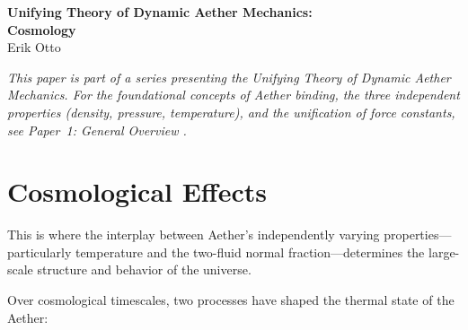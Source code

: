 ﻿\documentclass[12pt,letterpaper]{article}
\begin{document}
\begin{center}
{\LARGE\bfseries Unifying Theory of Dynamic Aether Mechanics:\\
Cosmology}\\[1em]
{\large Erik Otto}
\end{center}

\vspace{1em}

\begin{abstract}
Within the Dynamic Aether Mechanics framework, cosmological phenomena emerge
from the three independently varying properties of the Aether medium (density,
pressure, temperature).  This paper explains cosmological redshift as real Doppler
shift from thermal expansion of cosmic voids, dark energy as the thermal pressure
of hot void Aether, and dark matter as the two-fluid first-sound correction
(the outward increase in $c_1$ from the varying normal fraction provides
additional centripetal acceleration through the acoustic metric).  Black holes are identified as sonic horizons where Aether inflow
velocity reaches $c$, providing a concrete physical mechanism for Hawking radiation
via asymmetric transient binding at the horizon boundary.  Neutron stars serve as
natural laboratories for extreme-density Aether physics, with pulsar glitches
arising from quantized vortex avalanches.
\end{abstract}

\vspace{1em}

\bigskip
\noindent\textit{This paper is part of a series presenting the Unifying Theory of
Dynamic Aether Mechanics.  For the foundational concepts of Aether binding,
the three independent properties (density, pressure, temperature), and the
unification of force constants, see Paper~1: General Overview \cite{otto-overview}.}
\bigskip

\section{Cosmological Effects}

This is where the interplay between Aether's independently varying
properties---particularly temperature and the two-fluid normal fraction---determines
the large-scale structure and behavior of the universe.

Over cosmological timescales, two processes have shaped the thermal state of the Aether:
\end{document}
